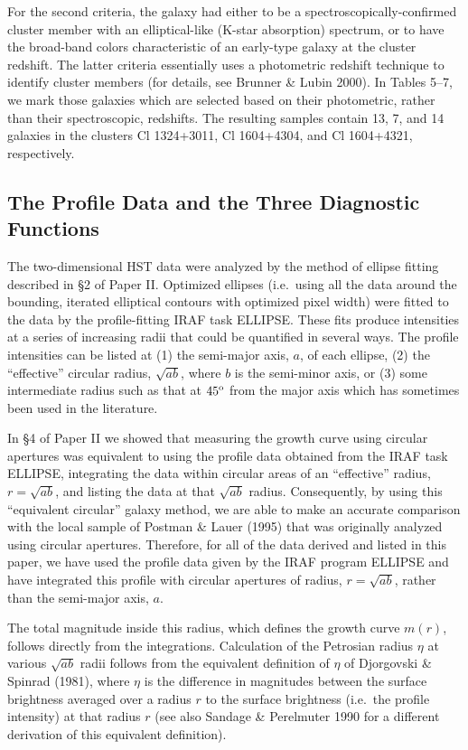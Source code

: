 \documentclass[preprint]{aastex}
\begin{document}
For the second criteria, the galaxy had either to be a
spectroscopically-confirmed cluster member with an elliptical-like
(K-star absorption) spectrum, or to have the broad-band colors
characteristic of an early-type galaxy at the cluster redshift. The
latter criteria essentially uses a photometric redshift technique to
identify cluster members (for details, see Brunner \& Lubin 2000).  In
Tables 5--7, we mark those galaxies which are selected based on their
photometric, rather than their spectroscopic, redshifts. The resulting
samples contain 13, 7, and 14 galaxies in the clusters Cl 1324+3011,
Cl 1604+4304, and Cl 1604+4321, respectively.

\subsection{The Profile Data and the Three Diagnostic Functions}

The two-dimensional HST data were analyzed by the method of ellipse
fitting described in \S 2 of Paper II. Optimized ellipses (i.e.\ using
all the data around the bounding, iterated elliptical contours with
optimized pixel width) were fitted to the data by the profile-fitting
IRAF task ELLIPSE.  These fits produce intensities at a series of
increasing radii that could be quantified in several ways. The profile
intensities can be listed at (1) the semi-major axis, $a$, of each
ellipse, (2) the ``effective'' circular radius, $\sqrt{ab}$, where $b$
is the semi-minor axis, or (3) some intermediate radius such as that
at $45^{\rm o}$ from the major axis which has sometimes been used in
the literature.

In \S 4 of Paper II we showed that measuring the growth curve using
circular apertures was equivalent to using the profile data obtained
from the IRAF task ELLIPSE, integrating the data within circular areas
of an ``effective'' radius, $r = \sqrt{ab}$, and listing the data at
that $\sqrt{ab}$ radius.  Consequently, by using this ``equivalent
circular'' galaxy method, we are able to make an accurate comparison
with the local sample of Postman \& Lauer (1995) that was originally
analyzed using circular apertures.  Therefore, for all of the data
derived and listed in this paper, we have used the profile data given
by the IRAF program ELLIPSE and have integrated this profile with
circular apertures of radius, $r = \sqrt{ab}$, rather than the
semi-major axis, $a$.

The total magnitude inside this radius, which defines the growth curve
$m(r)$, follows directly from the integrations. Calculation of the
Petrosian radius $\eta$ at various $\sqrt{ab}$ radii follows from the
equivalent definition of $\eta$ of Djorgovski \& Spinrad (1981), where
$\eta$ is the difference in magnitudes between the surface brightness
averaged over a radius $r$ to the surface brightness (i.e.\ the
profile intensity) at that radius $r$ (see also Sandage \& Perelmuter
1990 for a different derivation of this equivalent definition).
     
\end{document}
